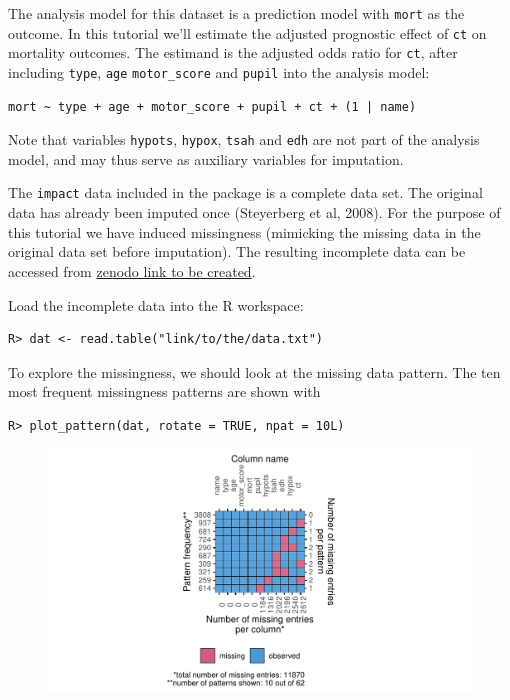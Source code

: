 \documentclass[
  article]{jss}
\begin{document}
The analysis model for this dataset is a prediction model with
\texttt{mort} as the outcome. In this tutorial we'll estimate the
adjusted prognostic effect of \texttt{ct} on mortality outcomes. The
estimand is the adjusted odds ratio for \texttt{ct}, after including
\texttt{type}, \texttt{age} \texttt{motor\_score} and \texttt{pupil}
into the analysis model:

\begin{verbatim}
mort ~ type + age + motor_score + pupil + ct + (1 | name) 
\end{verbatim}

Note that variables \texttt{hypots}, \texttt{hypox}, \texttt{tsah} and
\texttt{edh} are not part of the analysis model, and may thus serve as
auxiliary variables for imputation.

The \texttt{impact} data included in the  package is a
complete data set. The original data has already been imputed once
(Steyerberg et al, 2008). For the purpose of this tutorial we have
induced missingness (mimicking the missing data in the original data set
before imputation). The resulting incomplete data can be accessed from
\href{https://zenodo.com}{zenodo link to be created}.

Load the incomplete data into the R workspace:

\begin{verbatim}
R> dat <- read.table("link/to/the/data.txt") 
\end{verbatim}

To explore the missingness, we should look at the missing data pattern.
The ten most frequent missingness patterns are shown with

\begin{verbatim}
R> plot_pattern(dat, rotate = TRUE, npat = 10L)  
\end{verbatim}

\begin{figure}[h]

{\centering \includegraphics{manuscript_files/figure-pdf/unnamed-chunk-28-1.pdf}

}

\end{figure}
\end{document}
